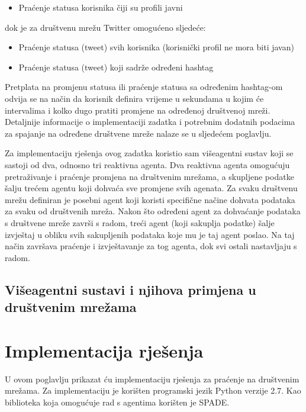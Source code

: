 \documentclass[a4paper,12pt]{foi}
\begin{document}
\begin{itemize}
\item{Praćenje statusa korisnika čiji su profili javni}
\end{itemize}
dok je za društvenu mrežu Twitter omogućeno sljedeće:
\begin{itemize}
\item{Praćenje statusa (tweet) svih korisnika (korisnički profil ne mora biti javan)}
\item{Praćenje statusa (tweet) koji sadrže određeni hashtag}
\end{itemize}

Pretplata na promjenu statusa ili praćenje statusa sa određenim hashtag-om odvija se na način da korisnik definira vrijeme u sekundama u kojim će intervalima i kolko dugo pratiti promjene na određenoj društvenoj mreži. Detaljnije informacije o implementaciji zadatka i potrebnim dodatnih podacima za spajanje na određene društvene mreže nalaze se u sljedećem poglavlju.

Za implementaciju rješenja ovog zadatka koristio sam višeagentni sustav koji se sastoji od dva, odnosno tri reaktivna agenta. Dva reaktivna agenta omogućuju pretraživanje i praćenje promjena na društvenim mrežama, a skupljene podatke šalju trećem agentu koji dohvaća sve promjene svih agenata. Za svaku društvenu mrežu definiran je posebni agent koji koristi specifične načine dohvata podataka za svaku od društvenih mreža. Nakon što određeni agent za dohvaćanje podataka s društvene mreže završi s radom, treći agent (koji sakuplja podatke) šalje izvještaj u obliku svih sakupljenih podataka koje mu je taj agent poslao. Na taj način završava praćenje i izvještavanje za tog agenta, dok svi ostali nastavljaju s radom.

\section{Višeagentni sustavi i njihova primjena u društvenim mrežama}

\citep{ArandaPalanca2012} \citep{JonkerTreur2002} \citep{Lerman2008}



\chapter{Implementacija rješenja}

U ovom poglavlju prikazat ću implementaciju rješenja za praćenje na društvenim mrežama. Za implementaciju je korišten programski jezik Python verzije 2.7. Kao biblioteka koja omogućuje rad s agentima korišten je SPADE.
\end{document}
